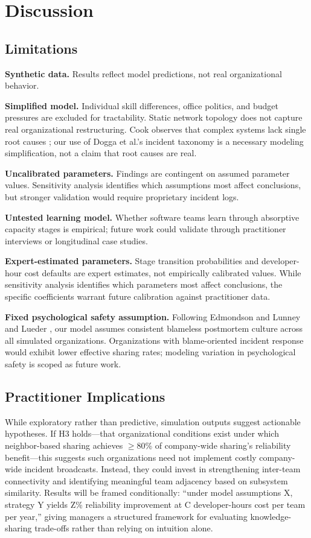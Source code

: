 \documentclass[conference,10pt]{IEEEtran}
\begin{document}
\section{Discussion}

\subsection{Limitations}

\textbf{Synthetic data.} Results reflect model predictions, not real organizational behavior.

\textbf{Simplified model.} Individual skill differences, office politics, and budget pressures are excluded for tractability. Static network topology does not capture real organizational restructuring. Cook observes that complex systems lack single root causes \cite{cook1998}; our use of Dogga et al.'s incident taxonomy is a necessary modeling simplification, not a claim that root causes are real.

\textbf{Uncalibrated parameters.} Findings are contingent on assumed parameter values. Sensitivity analysis identifies which assumptions most affect conclusions, but stronger validation would require proprietary incident logs.

\textbf{Untested learning model.} Whether software teams learn through absorptive capacity stages is empirical; future work could validate through practitioner interviews or longitudinal case studies.

\textbf{Expert-estimated parameters.} Stage transition probabilities and developer-hour cost defaults are expert estimates, not empirically calibrated values. While sensitivity analysis identifies which parameters most affect conclusions, the specific coefficients warrant future calibration against practitioner data.

\textbf{Fixed psychological safety assumption.} Following Edmondson \cite{edmondson1999} and Lunney and Lueder \cite{lunney2016}, our model assumes consistent blameless postmortem culture across all simulated organizations. Organizations with blame-oriented incident response would exhibit lower effective sharing rates; modeling variation in psychological safety is scoped as future work.

\subsection{Practitioner Implications}

While exploratory rather than predictive, simulation outputs suggest actionable hypotheses. If H3 holds---that organizational conditions exist under which neighbor-based sharing achieves $\geq$80\% of company-wide sharing's reliability benefit---this suggests such organizations need not implement costly company-wide incident broadcasts. Instead, they could invest in strengthening inter-team connectivity and identifying meaningful team adjacency based on subsystem similarity. Results will be framed conditionally: ``under model assumptions X, strategy Y yields Z\% reliability improvement at C developer-hours cost per team per year,'' giving managers a structured framework for evaluating knowledge-sharing trade-offs rather than relying on intuition alone.
\end{document}
